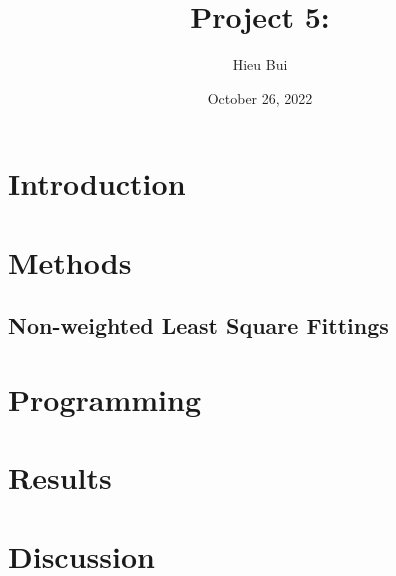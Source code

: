 \documentclass{article}
\title{Project 5: }
\author{Hieu Bui}
\date{October 26, 2022}
\begin{document}
\maketitle
\clearpage
\doublespacing
\section{Introduction}
 
\section{Methods}
\subsection{Non-weighted Least Square Fittings}
\section{Programming}
\section{Results}
\section{Discussion}
\end{document}
